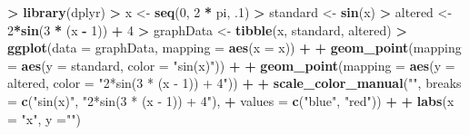 \documentclass[
]{krantz}
\makeatletter
\newenvironment{Shaded}{\begin{snugshade}}{\end{snugshade}}
\newcommand{\DataTypeTok}[1]{\textcolor[rgb]{0.27,0.27,0.27}{#1}}
\newcommand{\DecValTok}[1]{\textcolor[rgb]{0.06,0.06,0.06}{#1}}
\newcommand{\FloatTok}[1]{\textcolor[rgb]{0.06,0.06,0.06}{#1}}
\newcommand{\KeywordTok}[1]{\textcolor[rgb]{0.27,0.27,0.27}{\textbf{#1}}}
\newcommand{\NormalTok}[1]{#1}
\newcommand{\OperatorTok}[1]{\textcolor[rgb]{0.43,0.43,0.43}{\textbf{#1}}}
\newcommand{\StringTok}[1]{\textcolor[rgb]{0.5,0.5,0.5}{#1}}
\newenvironment{kframe}{%
\medskip{}
\setlength{\fboxsep}{.8em}
 \def\at@end@of@kframe{}%
 \ifinner\ifhmode%
  \def\at@end@of@kframe{\end{minipage}}%
  \begin{minipage}{\columnwidth}%
 \fi\fi%
 \def\FrameCommand##1{\hskip\@totalleftmargin \hskip-\fboxsep
 \colorbox{shadecolor}{##1}\hskip-\fboxsep
     \hskip-\linewidth \hskip-\@totalleftmargin \hskip\columnwidth}%
 \MakeFramed {\advance\hsize-\width
   \@totalleftmargin\z@ \linewidth\hsize
   \@setminipage}}%
 {\par\unskip\endMakeFramed%
 \at@end@of@kframe}
\renewenvironment{Shaded}{\begin{kframe}}{\end{kframe}}
\makeatother
\begin{document}
\begin{Shaded}
\begin{Highlighting}[]
\OperatorTok{\textgreater{}}\StringTok{ }\KeywordTok{library}\NormalTok{(dplyr)}
\OperatorTok{\textgreater{}}\StringTok{ }\NormalTok{x \textless{}{-}}\StringTok{ }\KeywordTok{seq}\NormalTok{(}\DecValTok{0}\NormalTok{, }\DecValTok{2} \OperatorTok{*}\StringTok{ }\NormalTok{pi, }\FloatTok{.1}\NormalTok{)}
\OperatorTok{\textgreater{}}\StringTok{ }\NormalTok{standard \textless{}{-}}\StringTok{ }\KeywordTok{sin}\NormalTok{(x)}
\OperatorTok{\textgreater{}}\StringTok{ }\NormalTok{altered \textless{}{-}}\StringTok{ }\DecValTok{2}\OperatorTok{*}\KeywordTok{sin}\NormalTok{(}\DecValTok{3} \OperatorTok{*}\StringTok{ }\NormalTok{(x }\OperatorTok{{-}}\StringTok{ }\DecValTok{1}\NormalTok{)) }\OperatorTok{+}\StringTok{ }\DecValTok{4}
\OperatorTok{\textgreater{}}\StringTok{ }\NormalTok{graphData \textless{}{-}}\StringTok{ }\KeywordTok{tibble}\NormalTok{(x, standard, altered)}
\OperatorTok{\textgreater{}}\StringTok{ }\KeywordTok{ggplot}\NormalTok{(}\DataTypeTok{data =}\NormalTok{ graphData, }\DataTypeTok{mapping =} \KeywordTok{aes}\NormalTok{(}\DataTypeTok{x =}\NormalTok{ x)) }\OperatorTok{+}\StringTok{ }
\OperatorTok{+}\StringTok{   }\KeywordTok{geom\_point}\NormalTok{(}\DataTypeTok{mapping =} \KeywordTok{aes}\NormalTok{(}\DataTypeTok{y =}\NormalTok{ standard, }\DataTypeTok{color =} \StringTok{"sin(x)"}\NormalTok{)) }\OperatorTok{+}\StringTok{ }
\OperatorTok{+}\StringTok{   }\KeywordTok{geom\_point}\NormalTok{(}\DataTypeTok{mapping =} \KeywordTok{aes}\NormalTok{(}\DataTypeTok{y =}\NormalTok{ altered, }\DataTypeTok{color =} \StringTok{"2*sin(3 * (x {-} 1)) + 4"}\NormalTok{)) }\OperatorTok{+}\StringTok{ }
\OperatorTok{+}\StringTok{   }\KeywordTok{scale\_color\_manual}\NormalTok{(}\StringTok{""}\NormalTok{, }\DataTypeTok{breaks =} \KeywordTok{c}\NormalTok{(}\StringTok{"sin(x)"}\NormalTok{, }\StringTok{"2*sin(3 * (x {-} 1)) + 4"}\NormalTok{), }
\OperatorTok{+}\StringTok{                      }\DataTypeTok{values =} \KeywordTok{c}\NormalTok{(}\StringTok{"blue"}\NormalTok{, }\StringTok{"red"}\NormalTok{)) }\OperatorTok{+}\StringTok{ }
\OperatorTok{+}\StringTok{   }\KeywordTok{labs}\NormalTok{(}\DataTypeTok{x =} \StringTok{"x"}\NormalTok{, }\DataTypeTok{y =}\StringTok{""}\NormalTok{)}
\end{Highlighting}
\end{Shaded}
\end{document}
